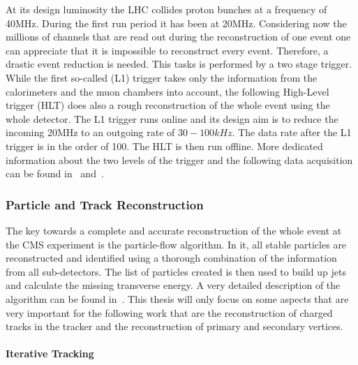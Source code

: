 At its design luminosity the LHC collides proton bunches at a frequency of 40\unit{MHz}. During the first run period it has been at 20\unit{MHz}. Considering now the millions of channels that are read out during the reconstruction of one event one can appreciate that it is impossible to reconstruct every event. Therefore, a drastic event reduction is needed. This tasks is performed by a two stage trigger. While the first so-called \Lone{} (L1) trigger takes only the information from the calorimeters and the muon chambers into account, the following High-Level trigger (HLT) does also a rough reconstruction of the whole event using the whole detector. The L1 trigger runs online and its design aim is to reduce the incoming 20\unit{MHz} to an outgoing rate of $30-100\unit{kHz}$. The data rate after the L1 trigger is in the order of 100\GBytes{}. The HLT is then run offline. More dedicated information about the two levels of the trigger and the following data acquisition can be found in~ and~.

\subsubsection{Particle and Track Reconstruction}

The key towards a complete and accurate reconstruction of the whole event at the CMS experiment is the particle-flow algorithm. In it, all stable particles are reconstructed and identified using a thorough combination of the information from all sub-detectors. The list of particles created is then used to build up jets and calculate the missing transverse energy. A very detailed description of the algorithm can be found in~. This thesis will only focus on some aspects that are very important for the following work that are the reconstruction of charged tracks in the tracker and the reconstruction of primary and secondary vertices.

\paragraph*{Iterative Tracking}

